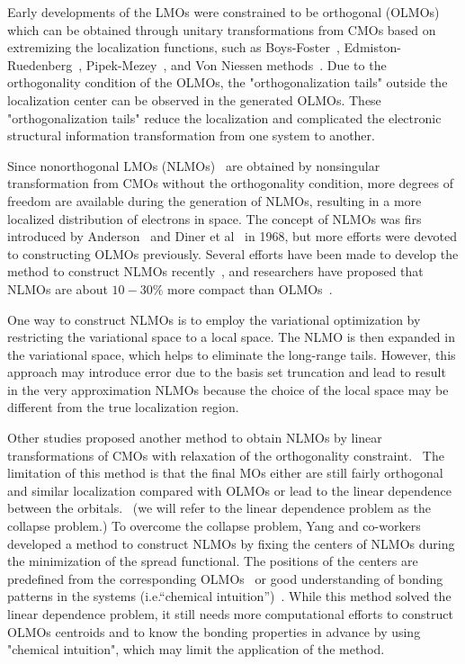 \documentclass[aps,prl,reprint,amsmath,amssymb]{revtex4-1}
\begin{document}
Early developments of the LMOs were constrained to be orthogonal (OLMOs)~\cite{weinstein1971localized} which can be obtained through unitary transformations from CMOs based on extremizing the localization functions, such as Boys-Foster~\cite{boys1960construction}, Edmiston-Ruedenberg~\cite{bytautas2002electron, bytautas2003split, edmiston1963localized}, Pipek-Mezey~\cite{pipek1989a_fast}, and Von Niessen methods~\cite{niessen1972density}.
Due to the orthogonality condition of the OLMOs, the "orthogonalization tails" outside the localization center can be observed in the generated OLMOs.
These "orthogonalization tails" reduce the localization and complicated the electronic structural information transformation from one system to another.

Since nonorthogonal LMOs (NLMOs)~\cite{anderson1968self, diner1968fully, magnasco1974localized, payne1977hartree, mehler1977self} are obtained by nonsingular transformation from CMOs without the orthogonality condition, more degrees of freedom are available during the generation of NLMOs, resulting in a more localized distribution of electrons in space.
The concept of NLMOs was firs introduced by Anderson~\cite{anderson1968self} and Diner et al~\cite{diner1968fully} in 1968, but more efforts were devoted to constructing OLMOs previously.
Several efforts have been made to develop the method to construct NLMOs recently~\cite{feng2004An_efficient, liu2000nonorthogonal, peng2013effective, hoyvik2017generalising}, and researchers have proposed that NLMOs are about $10-30 \%$ more compact than OLMOs~\cite{feng2004An_efficient, liu2000nonorthogonal}.

One way to construct NLMOs is to employ the variational optimization by restricting the variational space to a local space.
The NLMO is then expanded in the variational space, which helps to eliminate the long-range tails.
However, this approach may introduce error due to the basis set truncation and lead to result in the very approximation NLMOs because the choice of the local space may be different from the true localization region.

Other studies proposed another method to obtain NLMOs by linear transformations of CMOs with relaxation of the orthogonality constraint.~\cite{feng2004An_efficient, cui2010efficient} 
The limitation of this method is that the final MOs either are still fairly orthogonal and similar localization compared with OLMOs or lead to the linear dependence between the orbitals.~\cite{feng2004An_efficient} (we will refer to the linear dependence problem as the collapse problem.)
To overcome the collapse problem, Yang and co-workers~\cite{feng2004An_efficient, cui2010efficient}  developed a method to construct NLMOs by fixing the centers of NLMOs during the minimization of the spread functional. 
The positions of the centers are predefined from the corresponding OLMOs~\cite{feng2004An_efficient} or good understanding of bonding patterns in the systems (i.e.``chemical intuition'')~\cite{cui2010efficient}.
While this method solved the linear dependence problem, it still needs more computational efforts to construct OLMOs centroids and to know the bonding properties in advance by using "chemical intuition", which may limit the application of the method.
\end{document}
